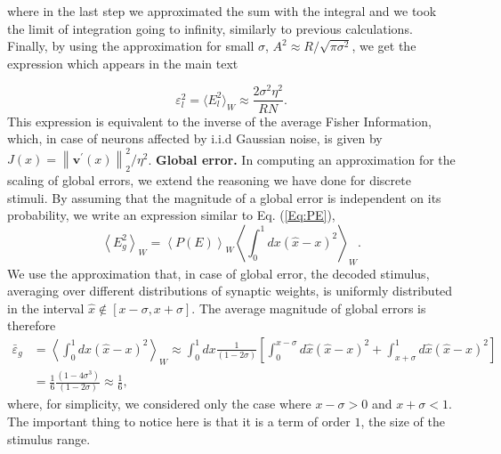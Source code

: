 \documentclass[a4paper]{article}%
\begin{document}
where in the last step we approximated the sum with the integral and we took
the limit of integration going to infinity, similarly to previous
calculations. Finally, by using the approximation for small $\sigma$, $A^{2}
\approx R/\sqrt{\pi\sigma^{2}}$, we get the expression which appears in the main text

\begin{equation}
\varepsilon_{l}^{2} = \langle E _{l}^{2}\rangle_{W} \approx\frac{2\sigma
^{2}\eta^{2}}{R N}.
\end{equation}
This expression is equivalent to the inverse of the average Fisher
Information, which, in case of neurons affected by i.i.d Gaussian noise, is
given by $J(x) = \left\|  \mathbf{v^{\prime}}(x)\right\|  _{2}^{2}/\eta^{2}$.
\newline\newline\textbf{Global error.} In computing an approximation for the
scaling of global errors, we extend the reasoning we have done for discrete
stimuli. By assuming that the magnitude of a global error is independent on
its probability, we write an expression similar to Eq. (\ref{Eq:PE}),
\begin{equation}
\left\langle E^{2}_{g}\right\rangle _{W} = \left\langle P(E)\right\rangle _{W}
\left\langle \int_{0}^{1} dx (\hat{x}-x)^{2}\right\rangle _{W}.
\end{equation}
We use the approximation that, in case of global error, the decoded
stimulus, averaging over different distributions of synaptic weights, is
uniformly distributed in the interval $\hat{x} \not \in [x-\sigma,x+\sigma]$.
The average magnitude of global errors is therefore
\begin{equation}
\begin{split}
\bar{\varepsilon}_{g} &= \left\langle \int_0^1 dx \left(  \hat{x}-x\right)
^{2}\right\rangle _{W} \approx \int_0^1 dx \frac{1}{\left(1-2\sigma\right)}\left[\int_{0}^{x-\sigma} d\hat{x} (\hat{x} -x)^2 + \int_{x+\sigma}^1d\hat{x} (\hat{x}-x)^2\right]\\
&= \frac{1}{6}\frac{\left(1-4\sigma^3\right)}{\left(1-2\sigma\right)} \approx \frac{1}{6} ,
\end{split}
\end{equation}
where, for simplicity, we considered only the case where $x-\sigma >0 $ and $x+\sigma<1$. The important thing to notice here is that it is a term of order $1$, the size of the stimulus range.
\end{document}
